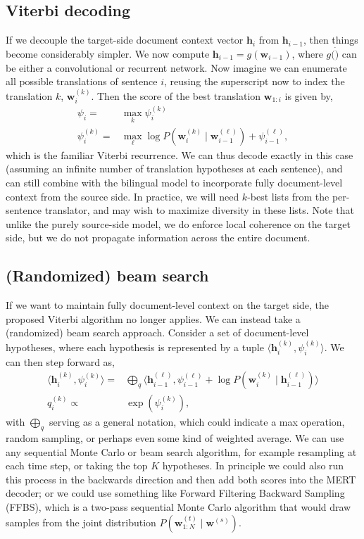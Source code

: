 \documentclass[11pt,a4paper]{article}
\renewcommand{\vec}[1]{\mathbf{#1}}
\newcommand{\vh}[0]{\vec{h}}
\newcommand{\vw}[0]{\vec{w}}
\newcommand{\vwt}[0]{\vw^{(t)}}
\newcommand{\vws}[0]{\vw^{(s)}}
\newcommand{\tuple}[1]{\langle #1 \rangle}
\begin{document}
\subsection{Viterbi decoding}
If we decouple the target-side document context vector $\vh_i$ from $\vh_{i-1}$, then things become considerably simpler. We now compute $\vh_{i-1} = g(\vw_{i-1})$, where $g(\dot)$ can be either a convolutional or recurrent network. Now imagine we can enumerate all possible translations of sentence $i$, reusing the superscript now to index the translation $k$, $\vw_i^{(k)}$. Then the score of the best translation $\vw_{1:i}$ is given by,
\begin{align}
\psi_i = & \max_k \psi_i^{(k)}\\
\psi_i^{(k)} = & \max_{\ell} \log P(\vw_i^{(k)} \mid \vw_{i-1}^{(\ell)}) + \psi_{i-1}^{(\ell)},
\end{align}
which is the familiar Viterbi recurrence. We can thus decode exactly in this case (assuming an infinite number of translation hypotheses at each sentence), and can still combine with the bilingual model to incorporate fully document-level context from the source side. In practice, we will need $k$-best lists from the per-sentence translator, and may wish to maximize diversity in these lists. Note that unlike the purely source-side model, we do enforce local coherence on the target side, but we do not propagate information across the entire document. 

\subsection{(Randomized) beam search}
If we want to maintain fully document-level context on the target side, the proposed Viterbi algorithm no longer applies. We can instead take a (randomized) beam search approach. Consider a set of document-level hypotheses, where each hypothesis is represented by a tuple $\tuple{\vh^{(k)}_i, \psi^{(k)}_i}$. We can then step forward as,
\begin{align}
\tuple{\vh^{(k)}_i, \psi^{(k)}_i} = & 
\bigoplus_q \tuple{\vh^{(\ell)}_{i-1}, \psi^{(\ell)}_{i-1}
+ \log P(\vw_i^{(k)} \mid \vh_{i-1}^{(\ell)})}\\
q^{(k)}_i \propto & \exp (\psi^{(k)}_i),
\end{align}
with $\bigoplus_q$ serving as a general notation, which could indicate a max operation, random sampling, or perhaps even some kind of weighted average. We can use any sequential Monte Carlo or beam search algorithm, for example resampling at each time step, or taking the top $K$ hypotheses. In principle we could also run this process in the backwards direction and then add both scores into the MERT decoder; or we could use something like Forward Filtering Backward Sampling (FFBS), which is a two-pass sequential Monte Carlo algorithm that would draw samples from the joint distribution $P(\vwt_{1:N} \mid \vws)$.



\end{document}
